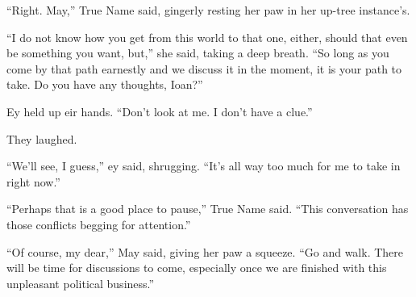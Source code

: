 ``Right. May,'' True Name said, gingerly resting her paw in her up-tree instance's.

``I do not know how you get from this world to that one, either, should that even be something you want, but,'' she said, taking a deep breath. ``So long as you come by that path earnestly and we discuss it in the moment, it is your path to take. Do you have any thoughts, Ioan?''

Ey held up eir hands. ``Don't look at me. I don't have a clue.''

They laughed.

``We'll see, I guess,'' ey said, shrugging. ``It's all way too much for me to take in right now.''

``Perhaps that is a good place to pause,'' True Name said. ``This conversation has those conflicts begging for attention.''

``Of course, my dear,'' May said, giving her paw a squeeze. ``Go and walk. There will be time for discussions to come, especially once we are finished with this unpleasant political business.''
